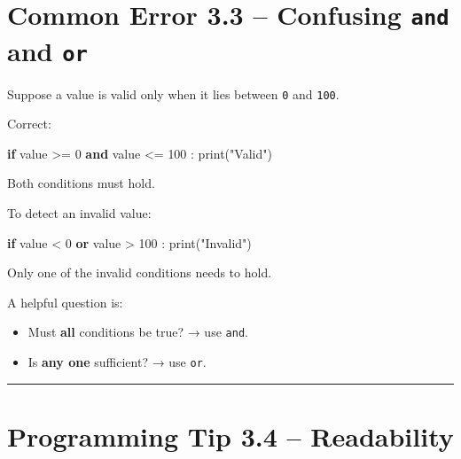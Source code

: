 \documentclass[
  11pt,
  a4paper,
]{article}
\newenvironment{Shaded}{}{}
\newcommand{\BuiltInTok}[1]{\textcolor[rgb]{0.00,0.50,0.00}{#1}}
\newcommand{\ControlFlowTok}[1]{\textcolor[rgb]{0.00,0.44,0.13}{\textbf{#1}}}
\newcommand{\DecValTok}[1]{\textcolor[rgb]{0.25,0.63,0.44}{#1}}
\newcommand{\KeywordTok}[1]{\textcolor[rgb]{0.00,0.44,0.13}{\textbf{#1}}}
\newcommand{\NormalTok}[1]{#1}
\newcommand{\OperatorTok}[1]{\textcolor[rgb]{0.40,0.40,0.40}{#1}}
\newcommand{\StringTok}[1]{\textcolor[rgb]{0.25,0.44,0.63}{#1}}
\providecommand{\tightlist}{%
  \setlength{\itemsep}{0pt}\setlength{\parskip}{0pt}}
\begin{document}
\section{\texorpdfstring{Common Error 3.3 -- Confusing \texttt{and} and
\texttt{or}}{Common Error 3.3 -- Confusing and and or}}\label{common-error-3.3-confusing-and-and-or}

Suppose a value is valid only when it lies between \texttt{0} and
\texttt{100}.

Correct:

\begin{Shaded}
\begin{Highlighting}[]
\ControlFlowTok{if}\NormalTok{ value }\OperatorTok{\textgreater{}=} \DecValTok{0} \KeywordTok{and}\NormalTok{ value }\OperatorTok{\textless{}=} \DecValTok{100}\NormalTok{ :}
    \BuiltInTok{print}\NormalTok{(}\StringTok{"Valid"}\NormalTok{)}
\end{Highlighting}
\end{Shaded}

Both conditions must hold.

To detect an invalid value:

\begin{Shaded}
\begin{Highlighting}[]
\ControlFlowTok{if}\NormalTok{ value }\OperatorTok{\textless{}} \DecValTok{0} \KeywordTok{or}\NormalTok{ value }\OperatorTok{\textgreater{}} \DecValTok{100}\NormalTok{ :}
    \BuiltInTok{print}\NormalTok{(}\StringTok{"Invalid"}\NormalTok{)}
\end{Highlighting}
\end{Shaded}

Only one of the invalid conditions needs to hold.

A helpful question is:

\begin{itemize}
\tightlist
\item
  Must \textbf{all} conditions be true? → use \texttt{and}.
\item
  Is \textbf{any one} sufficient? → use \texttt{or}.
\end{itemize}

\begin{center}\rule{0.5\linewidth}{0.5pt}\end{center}

\section{Programming Tip 3.4 --
Readability}\label{programming-tip-3.4-readability}
\end{document}
